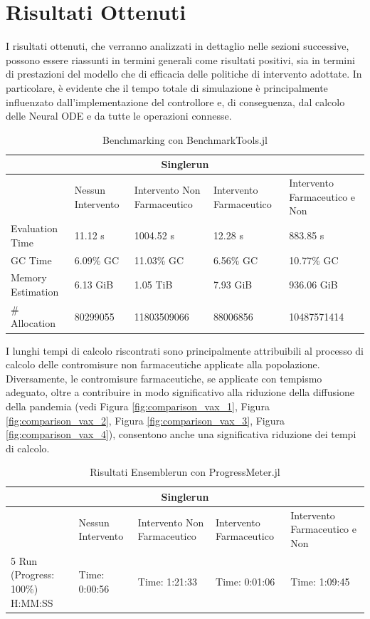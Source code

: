 \section{Risultati Ottenuti}

I risultati ottenuti, che verranno analizzati in dettaglio nelle 
sezioni successive, possono essere riassunti in termini generali come 
risultati positivi, sia in termini di prestazioni del modello che di 
efficacia delle politiche di intervento adottate. In particolare, 
è evidente che il tempo totale di simulazione è principalmente 
influenzato dall'implementazione del controllore e, di conseguenza, 
dal calcolo delle Neural ODE e da tutte le operazioni connesse.

\begin{table}[htb]
    \centering
    \caption{Benchmarking con BenchmarkTools.jl \cite{chen2016robust}}
    \begin{tabular}{|p{2.57cm}||p{2.57cm}|p{2.57cm}|p{2.57cm}|p{2.57cm}|}
        \hline
        \multicolumn{5}{|c|}{Singlerun} \\
        \hline
        & Nessun Intervento & Intervento Non Farmaceutico & Intervento Farmaceutico & Intervento Farmaceutico e Non \\
        \hline
        Evaluation Time & 11.12 s & 1004.52 s & 12.28 s & 883.85 s \\
        GC Time & 6.09\% GC & 11.03\% GC & 6.56\% GC & 10.77\% GC \\
		Memory Estimation & 6.13 GiB & 1.05 TiB & 7.93 GiB & 936.06 GiB \\
        \# Allocation & 80299055 & 11803509066 & 88006856 & 10487571414 \\
		\hline
    \end{tabular}
\end{table}

I lunghi tempi di calcolo riscontrati sono principalmente attribuibili 
al processo di calcolo delle contromisure non farmaceutiche applicate 
alla popolazione. Diversamente, le contromisure farmaceutiche, 
se applicate con tempismo adeguato, oltre a contribuire in modo 
significativo alla riduzione della diffusione della pandemia 
(vedi Figura \ref{fig:comparison_vax_1}, Figura 
\ref{fig:comparison_vax_2}, Figura \ref{fig:comparison_vax_3}, 
Figura \ref{fig:comparison_vax_4}), consentono anche una significativa 
riduzione dei tempi di calcolo.

\begin{table}[htb]
    \centering
    \caption{Risultati Ensemblerun con ProgressMeter.jl}
    \begin{tabular}{|p{2.57cm}||p{2.57cm}|p{2.57cm}|p{2.57cm}|p{2.57cm}|}
        \hline
        \multicolumn{5}{|c|}{Singlerun} \\
        \hline
        & Nessun Intervento & Intervento Non Farmaceutico & Intervento Farmaceutico & Intervento Farmaceutico e Non \\
        \hline
        5 Run (Progress: 100\%) H:MM:SS & Time: 0:00:56 & Time: 1:21:33 & Time: 0:01:06 & Time: 1:09:45 \\
        \hline
    \end{tabular}
\end{table}

